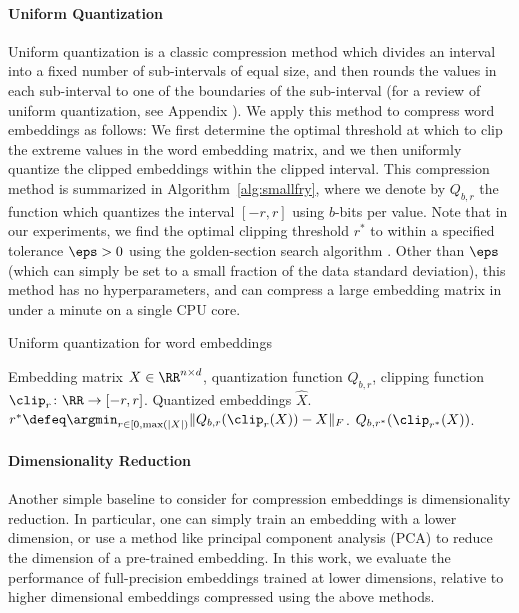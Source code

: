 \paragraph{Uniform Quantization}
Uniform quantization is a classic compression method which divides an interval into a fixed number of sub-intervals of equal size, and then rounds the values in each sub-interval to one of the boundaries of the sub-interval \citep{quant77} (for a review of uniform quantization, see Appendix ).
We apply this method to compress word embeddings as follows:
We first determine the optimal threshold at which to clip the extreme values in the word embedding matrix, and we then uniformly quantize the clipped embeddings within the clipped interval.
This compression method is summarized in Algorithm~\ref{alg:smallfry}, where we denote by $Q_{b,r}$ the function which quantizes the interval $[-r,r]$ using $b$-bits per value.
Note that in our experiments, we find the optimal clipping threshold $r^*$ to within a specified tolerance $\eps > 0$ using the golden-section search algorithm \citep{golden53}.
Other than $\eps$ (which can simply be set to a small fraction of the data standard deviation), this method has no hyperparameters, and can compress a large embedding matrix in under a minute on a single CPU core.

\begin{algorithm}[tb]
	\caption{Uniform quantization for word embeddings}
	\label{alg:smallfry}
	\begin{algorithmic}[1]
		  Embedding matrix $X \in \RR^{n \times d}$, quantization function $Q_{b,r}$, clipping function $\clip_r\colon\RR\rightarrow[-r,r]$.
		 Quantized embeddings $\hat{X}$.
		\STATE $r^* \defeq \argmin_{r \in [0,\max(|X|)} \|Q_{b,r}(\clip_r(X))-X\|_F$.
		 $Q_{b,r^*}(\clip_{r^*}(X))$.
	\end{algorithmic}
\end{algorithm}

\paragraph{Dimensionality Reduction}
Another simple baseline to consider for compression embeddings is dimensionality reduction.
In particular, one can simply train an embedding with a lower dimension, or use a method like principal component analysis (PCA) to reduce the dimension of a pre-trained embedding.
In this work, we evaluate the performance of full-precision embeddings trained at lower dimensions, relative to higher dimensional embeddings compressed using the above methods.

